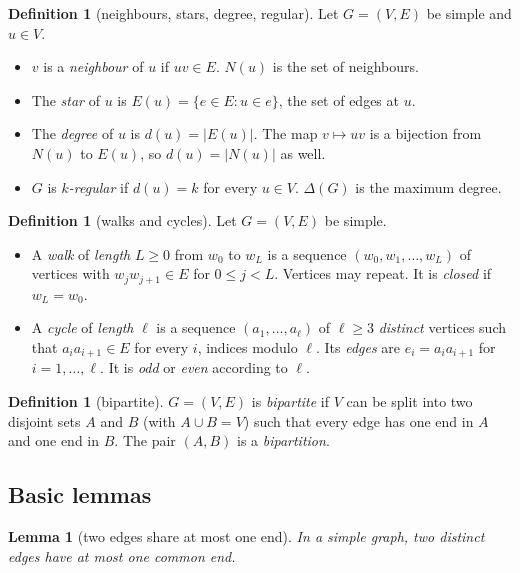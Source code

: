 \documentclass[11pt]{article}
\theoremstyle{plain}
\newtheorem{lemma}[theorem]{Lemma}
\theoremstyle{definition}
\newtheorem{definition}[theorem]{Definition}
\theoremstyle{remark}
\newcommand{\st}[1]{E(#1)}
\begin{document}
\begin{definition}[neighbours, stars, degree, regular]
Let $G=(V,E)$ be simple and $u\in V$.
\begin{itemize}
  \item $v$ is a \emph{neighbour} of $u$ if $uv\in E$. $N(u)$ is the set of neighbours.
  \item The \emph{star} of $u$ is $\st{u}=\{e\in E: u\in e\}$, the set of edges at $u$.
  \item The \emph{degree} of $u$ is $d(u)=|\st{u}|$. The map $v\mapsto uv$ is a bijection from
    $N(u)$ to $\st{u}$, so $d(u)=|N(u)|$ as well.
  \item $G$ is \emph{$k$-regular} if $d(u)=k$ for every $u\in V$. $\Delta(G)$ is the maximum
    degree.
\end{itemize}
\end{definition}

\begin{definition}[walks and cycles]\label{def:walk}
Let $G=(V,E)$ be simple.
\begin{itemize}
  \item A \emph{walk} of \emph{length} $L\ge 0$ from $w_0$ to $w_L$ is a sequence
    $(w_0,w_1,\dots,w_L)$ of vertices with $w_jw_{j+1}\in E$ for $0\le j<L$. Vertices may repeat.
    It is \emph{closed} if $w_L=w_0$.
  \item A \emph{cycle} of \emph{length} $\ell$ is a sequence $(a_1,\dots,a_\ell)$ of
    $\ell\ge 3$ \emph{distinct} vertices such that $a_ia_{i+1}\in E$ for every $i$, indices
    modulo $\ell$. Its \emph{edges} are $e_i=a_ia_{i+1}$ for $i=1,\dots,\ell$. It is \emph{odd}
    or \emph{even} according to $\ell$.
\end{itemize}
\end{definition}

\begin{definition}[bipartite]\label{def:bipartite}
$G=(V,E)$ is \emph{bipartite} if $V$ can be split into two disjoint sets $A$ and $B$
(with $A\cup B=V$) such that every edge has one end in $A$ and one end in $B$. The pair $(A,B)$ is
a \emph{bipartition}.
\end{definition}

\subsection{Basic lemmas}

\begin{lemma}[two edges share at most one end]\label{lem:one-end}
In a simple graph, two distinct edges have at most one common end.
\end{lemma}
\end{document}
